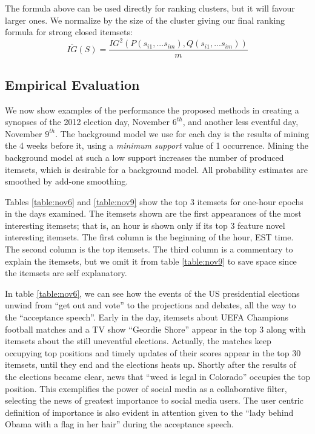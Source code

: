 \documentclass{sig-alternate}
\begin{document}
The formula above can be used directly for ranking clusters,
but it will favour larger ones.
We normalize by the size of the cluster giving our final ranking formula for
strong closed itemsets:
\begin{equation}\label{eq:avgIG}\overline{IG}(S) = \frac{IG^2(P(s_{i1},...s_{im}),Q(s_{i1},...s_{im}))}{m}\end{equation}


\subsection{Empirical Evaluation}
\label{sec:empirical}
We now show examples of the performance the proposed methods in creating
a synopses of the 2012 election day, November $6^{th}$, and another less
eventful day, November $9^{th}$.
The background model we use for each day is the results of mining the 4 weeks
before it, using a \emph{minimum support} value of 1 occurrence.
Mining the background model at such a low support increases the number of
produced itemsets, which is desirable for a background model.
All probability estimates are smoothed by add-one smoothing. 

Tables \ref{table:nov6} and \ref{table:nov9}  show the top 3 itemsets for
one-hour epochs in the days examined.
The itemsets shown are the first appearances of the most interesting itemsets;
that is, an hour is shown only if its top 3 feature novel interesting itemsets. The first column is the beginning of the hour, EST time.
The second column is the top itemsets.
The third column is a commentary to explain the itemsets,
but we omit it from table \ref{table:nov9} to save space since the itemsets are self explanatory.

In table \ref{table:nov6}, we can see how the events of the US presidential
elections  unwind from ``get out and vote'' to the projections and debates,
all the way to the ``acceptance speech''.
Early in the day, itemsets about UEFA Champions football matches and a TV show
``Geordie Shore'' appear in the top 3 along with itemsets about the still
uneventful elections.
Actually, the matches keep occupying top positions and timely updates of their
scores appear in the top 30 itemsets, until they end and the elections
heats up.
Shortly after the results of the elections became clear, news that
``weed is legal in Colorado'' occupies the top position.
This exemplifies the power of social media as a collaborative filter,
selecting the news of greatest importance to social media users.
The user centric definition of importance is also evident in attention
given to the ``lady behind Obama  with a flag in her hair'' during the
acceptance speech. 
\end{document}
